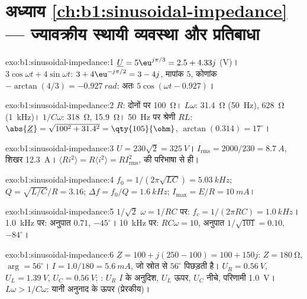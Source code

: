 \section*{अध्याय \ref{ch:b1:sinusoidal-impedance} --- ज्यावक्रीय स्थायी व्यवस्था और प्रतिबाधा}

\begin{solution}{exo:b1:sinusoidal-impedance:1}
$\underline U = 5\eu^{j\pi/3} = 2.5 + 4.33j$ (V)। $3\cos\omega t +
4\sin\omega t$: $3 + 4\eu^{-j\pi/2} = 3 - 4j$, मापांक $5$, कोणांक
$-\arctan(4/3) = \qty{-0.927}{rad}$: अतः $5\cos(\omega t - 0.927)$।
\end{solution}

\begin{solution}{exo:b1:sinusoidal-impedance:2}
$R$: दोनों पर \qty{100}{\ohm}। $L\omega$: \qty{31.4}{\ohm} (\qty{50}{Hz}),
\qty{628}{\ohm} (\qty{1}{kHz})। $1/C\omega$: \qty{318}{\ohm}, \qty{15.9}{\ohm}।
\qty{50}{Hz} पर श्रेणी $RL$: $\abs{\underline Z} = \sqrt{100^2 + 31.4^2} =
\qty{105}{\ohm}$,  $\arctan(0.314) = 17^\circ$।
\end{solution}

\begin{solution}{exo:b1:sinusoidal-impedance:3}
$U = 230\sqrt2 = \qty{325}{V}$। $I_{\mathrm{rms}} = 2000/230 = \qty{8.7}{A}$,
शिखर \qty{12.3}{A}। $\langle Ri^2\rangle = R\langle i^2\rangle =
RI_{\mathrm{rms}}^2$,  की परिभाषा से ही।
\end{solution}

\begin{solution}{exo:b1:sinusoidal-impedance:4}
$f_0 = 1/(2\pi\sqrt{LC}) = \qty{5.03}{kHz}$; $Q = \sqrt{L/C}/R = 3.16$;
$\Delta f = f_0/Q = \qty{1.6}{kHz}$; $I_{\max} = E/R = \qty{10}{mA}$।
\end{solution}

\begin{solution}{exo:b1:sinusoidal-impedance:5}
$1/\sqrt2$ $\omega = 1/RC$ पर: $f_c = 1/(2\pi RC) = \qty{1.0}{kHz}$।
\qty{1.0}{kHz} पर: अनुपात $0.71$,  $-45^\circ$। \qty{10}{kHz} पर:
$RC\omega = 10$, अनुपात $1/\sqrt{101} = 0.10$,  $-84^\circ$।
\end{solution}

\begin{solution}{exo:b1:sinusoidal-impedance:6}
$\underline Z = 100 + j(250 - 100) = 100 + 150j$: $Z = \qty{180}{\ohm}$,
$\arg = 56^\circ$। $I = 1.0/180 = \qty{5.6}{mA}$, जो स्रोत से
$56^\circ$ पिछड़ती है। $U_R = \qty{0.56}{V}$, $U_L = \qty{1.39}{V}$, $U_C = \qty{0.56}{V}$;
: $U_R$ $I$ के अनुदिश, $U_L$ ऊपर, $U_C$ नीचे, परिणामी \qty{1.0}{V}।
$L\omega > 1/C\omega$: यानी अनुनाद के ऊपर (प्रेरकीय)।
\end{solution}


